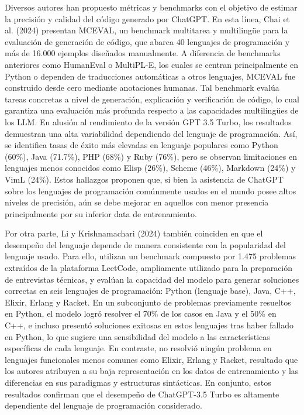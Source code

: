 \documentclass[12pt,a4paper]{article}
\begin{document}
Diversos autores han propuesto métricas y benchmarks con el objetivo de estimar la precisión y calidad del código generado por ChatGPT. En esta línea, Chai et al. (2024) presentan MCEVAL, un benchmark multitarea y multilingüe para la evaluación de generación de código, que abarca 40 lenguajes de programación y más de 16.000 ejemplos diseñados manualmente. A diferencia de benchmarks anteriores como HumanEval o MultiPL-E, los cuales se centran principalmente en Python o dependen de traducciones automáticas a otros lenguajes, MCEVAL fue construido desde cero mediante anotaciones humanas. Tal benchmark evalúa tareas concretas a nivel de generación, explicación y verificación de código, lo cual garantiza una evaluación más profunda respecto a las capacidades multilingües de los LLM. En alusión al rendimiento de la versión GPT 3.5 Turbo, los resultados demuestran una alta variabilidad dependiendo del lenguaje de programación. Así, se identifica tasas de éxito más elevadas en lenguaje populares como Python (60\%), Java (71.7\%), PHP (68\%) y Ruby (76\%), pero se observan limitaciones en lenguajes menos conocidos como Elisp (26\%), Scheme (46\%), Markdown (24\%) y VimL (24\%). Estos hallazgos proponen que, si bien la asistencia de ChatGPT sobre los lenguajes de programación comúnmente usados en el mundo posee altos niveles de precisión, aún se debe mejorar en aquellos con menor presencia principalmente por su inferior data de entrenamiento.

Por otra parte, Li y Krishnamachari (2024) también coinciden en que el desempeño del lenguaje depende de manera consistente con la popularidad del lenguaje usado. Para ello, utilizan un benchmark compuesto por 1.475 problemas extraídos de la plataforma LeetCode, ampliamente utilizado para la preparación de entrevistas técnicas, y evalúan la capacidad del modelo para generar soluciones correctas en seis lenguajes de programación: Python (lenguaje base), Java, C++, Elixir, Erlang y Racket. En un subconjunto de problemas previamente resueltos en Python, el modelo logró resolver el 70\% de los casos en Java y el 50\% en C++, e incluso presentó soluciones exitosas en estos lenguajes tras haber fallado en Python, lo que sugiere una sensibilidad del modelo a las características específicas de cada lenguaje. En contraste, no resolvió ningún problema en lenguajes funcionales menos comunes como Elixir, Erlang y Racket, resultado que los autores atribuyen a su baja representación en los datos de entrenamiento y las diferencias en sus paradigmas y estructuras sintácticas. En conjunto, estos resultados confirman que el desempeño de ChatGPT-3.5 Turbo es altamente dependiente del lenguaje de programación considerado.
\end{document}
